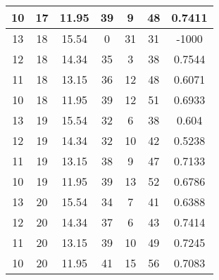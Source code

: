 \documentclass[letterpaper, 12pt]{article}
\begin{document}
\begin{longtable}{|c|c|c|c|c|c|c|}
\hline
10 & 17 & 11.95 & 39 & 9 & 48 & 0.7411 \\
\hline
13 & 18 & 15.54 & 0 & 31 & 31 & -1000 \\
\hline
12 & 18 & 14.34 & 35 & 3 & 38 & 0.7544 \\
\hline
11 & 18 & 13.15 & 36 & 12 & 48 & 0.6071 \\
\hline
10 & 18 & 11.95 & 39 & 12 & 51 & 0.6933 \\
\hline
13 & 19 & 15.54 & 32 & 6 & 38 & 0.604 \\
\hline
12 & 19 & 14.34 & 32 & 10 & 42 & 0.5238 \\
\hline
11 & 19 & 13.15 & 38 & 9 & 47 & 0.7133 \\
\hline
10 & 19 & 11.95 & 39 & 13 & 52 & 0.6786 \\
\hline
13 & 20 & 15.54 & 34 & 7 & 41 & 0.6388 \\
\hline
12 & 20 & 14.34 & 37 & 6 & 43 & 0.7414 \\
\hline
11 & 20 & 13.15 & 39 & 10 & 49 & 0.7245 \\
\hline
10 & 20 & 11.95 & 41 & 15 & 56 & 0.7083 \\
\hline
\end{longtable}
\end{document}
